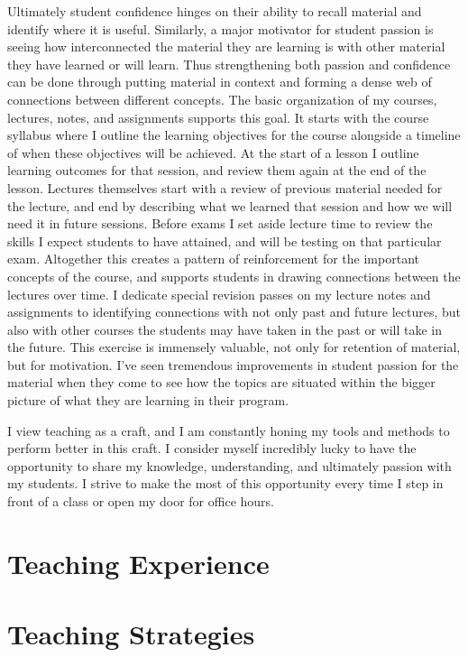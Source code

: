 \documentclass{article}
\begin{document}
Ultimately student confidence hinges on their ability to recall material and identify where it is useful. Similarly, a major motivator for student passion is seeing how interconnected the material they are learning is with other material they have learned or will learn. Thus strengthening both passion and confidence can be done through putting material in context and forming a dense web of connections between different concepts. The basic organization of my courses, lectures, notes, and assignments supports this goal. It starts with the course syllabus where I outline the learning objectives for the course alongside a timeline of when these objectives will be achieved. At the start of a lesson I outline learning outcomes for that session, and review them again at the end of the lesson. Lectures themselves start with a review of previous material needed for the lecture, and end by describing what we learned that session and how we will need it in future sessions. Before exams I set aside lecture time to review the skills I expect students to have attained, and will be testing on that particular exam. Altogether this creates a pattern of reinforcement for the important concepts of the course, and supports students in drawing connections between the lectures over time. I dedicate special revision passes on my lecture notes and assignments to identifying connections with not only past and future lectures, but also with other courses the students may have taken in the past or will take in the future. This exercise is immensely valuable, not only for retention of material, but for motivation. I’ve seen tremendous improvements in student passion for the material when they come to see how the topics are situated within the bigger picture of what they are learning in their program.

I view teaching as a craft, and I am constantly honing my tools and methods to perform better in this craft. I consider myself incredibly lucky to have the opportunity to share my knowledge, understanding, and ultimately passion with my students. I strive to make the most of this opportunity every time I step in front of a class or open my door for office hours.

\section{Teaching Experience}

\section{Teaching Strategies}
\end{document}

